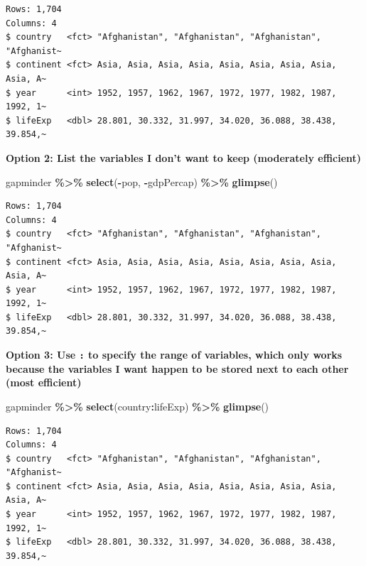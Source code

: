 \documentclass[
]{book}
\makeatletter
\newenvironment{Shaded}{\begin{snugshade}}{\end{snugshade}}
\newcommand{\FunctionTok}[1]{\textcolor[rgb]{0.27,0.27,0.27}{\textbf{#1}}}
\newcommand{\NormalTok}[1]{#1}
\newcommand{\SpecialCharTok}[1]{\textcolor[rgb]{0.43,0.43,0.43}{\textbf{#1}}}
\newenvironment{kframe}{%
\medskip{}
\setlength{\fboxsep}{.8em}
 \def\at@end@of@kframe{}%
 \ifinner\ifhmode%
  \def\at@end@of@kframe{\end{minipage}}%
  \begin{minipage}{\columnwidth}%
 \fi\fi%
 \def\FrameCommand##1{\hskip\@totalleftmargin \hskip-\fboxsep
 \colorbox{shadecolor}{##1}\hskip-\fboxsep
     \hskip-\linewidth \hskip-\@totalleftmargin \hskip\columnwidth}%
 \MakeFramed {\advance\hsize-\width
   \@totalleftmargin\z@ \linewidth\hsize
   \@setminipage}}%
 {\par\unskip\endMakeFramed%
 \at@end@of@kframe}
\renewenvironment{Shaded}{\begin{kframe}}{\end{kframe}}
\makeatother
\begin{document}
\begin{verbatim}
Rows: 1,704
Columns: 4
$ country   <fct> "Afghanistan", "Afghanistan", "Afghanistan", "Afghanist~
$ continent <fct> Asia, Asia, Asia, Asia, Asia, Asia, Asia, Asia, Asia, A~
$ year      <int> 1952, 1957, 1962, 1967, 1972, 1977, 1982, 1987, 1992, 1~
$ lifeExp   <dbl> 28.801, 30.332, 31.997, 34.020, 36.088, 38.438, 39.854,~
\end{verbatim}

\textbf{Option 2: List the variables I don't want to keep (moderately efficient)}

\begin{Shaded}
\begin{Highlighting}[]
\NormalTok{gapminder }\SpecialCharTok{\%\textgreater{}\%} 
  \FunctionTok{select}\NormalTok{(}\SpecialCharTok{{-}}\NormalTok{pop, }\SpecialCharTok{{-}}\NormalTok{gdpPercap) }\SpecialCharTok{\%\textgreater{}\%} 
  \FunctionTok{glimpse}\NormalTok{()}
\end{Highlighting}
\end{Shaded}

\begin{verbatim}
Rows: 1,704
Columns: 4
$ country   <fct> "Afghanistan", "Afghanistan", "Afghanistan", "Afghanist~
$ continent <fct> Asia, Asia, Asia, Asia, Asia, Asia, Asia, Asia, Asia, A~
$ year      <int> 1952, 1957, 1962, 1967, 1972, 1977, 1982, 1987, 1992, 1~
$ lifeExp   <dbl> 28.801, 30.332, 31.997, 34.020, 36.088, 38.438, 39.854,~
\end{verbatim}

\textbf{Option 3: Use \texttt{:} to specify the range of variables, which only works because the variables I want happen to be stored next to each other (most efficient)}

\begin{Shaded}
\begin{Highlighting}[]
\NormalTok{gapminder }\SpecialCharTok{\%\textgreater{}\%} 
  \FunctionTok{select}\NormalTok{(country}\SpecialCharTok{:}\NormalTok{lifeExp) }\SpecialCharTok{\%\textgreater{}\%} 
  \FunctionTok{glimpse}\NormalTok{()}
\end{Highlighting}
\end{Shaded}

\begin{verbatim}
Rows: 1,704
Columns: 4
$ country   <fct> "Afghanistan", "Afghanistan", "Afghanistan", "Afghanist~
$ continent <fct> Asia, Asia, Asia, Asia, Asia, Asia, Asia, Asia, Asia, A~
$ year      <int> 1952, 1957, 1962, 1967, 1972, 1977, 1982, 1987, 1992, 1~
$ lifeExp   <dbl> 28.801, 30.332, 31.997, 34.020, 36.088, 38.438, 39.854,~
\end{verbatim}
\end{document}

